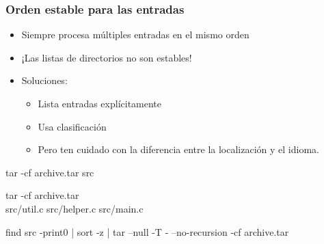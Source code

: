 \documentclass[14pt,aspectratio=169]{beamer}
\begin{document}
\begin{frame}[plain]
\end{frame}

\begin{frame}[fragile]
 \frametitle{Orden estable para las entradas}

 \begin{itemize}
  \item Siempre procesa múltiples entradas en el mismo orden
  \item ¡Las listas de directorios no son estables!
  \item<2-> Soluciones:
   \begin{itemize}
    \item Lista entradas explícitamente
    \item<3-> Usa clasificación
    \item<4> \alert{Pero ten cuidado con la diferencia entre la localización y el idioma.}
   \end{itemize}
 \end{itemize}

 \begin{example}
  \begin{overprint}
\begin{semiverbatim}
tar -cf archive.tar src
\end{semiverbatim}
\begin{semiverbatim}
tar -cf archive.tar \\
  src/util.c src/helper.c src/main.c
\end{semiverbatim}
\begin{semiverbatim}
find src -print0 | sort -z |
  tar --null -T - --no-recursion -cf archive.tar
\end{semiverbatim}
  \end{overprint}
 \end{example}
\end{frame}
\end{document}

